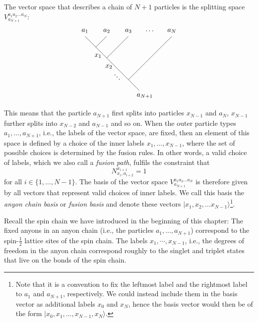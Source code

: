 The vector space that describes a chain of $N+1$ particles is the splitting space $V^{a_1a_2\dots a_N}_{a_{N+1}}$:
	\begin{equation}
		\begin{tikzpicture}[scale=1.1]
			\draw (0,0) -- (-2.5,2.5);
			\draw (-0.5,0.5) -- (1.5,2.5);
			\draw (-1.5,1.5) -- (-0.5,2.5);
			\draw (-2,2) -- (-1.5,2.5);
			\node at (0.25,-0.25) {$a_{N+1}$};
			\node at (-2.5,2.75) {$a_1$};
			\node at (-1.5,2.75) {$a_2$};
			\node at (-0.5,2.75) {$a_3$};
			\node at (1.5,2.75) {$a_N$};
			\node at (0.5,2.75) {$\dots$};
			\node at (-1.9,1.6) {$x_1$};
			\node at (-1.4,1.1) {$x_2$};
			\node at (-1,0.6) {\rotatebox{-45}{$\dots$}};
		\end{tikzpicture}
	\end{equation}
This means that the particle $a_{N+1}$ first splits into particles $x_{N-1}$ and $a_N$, $x_{N-1}$ further splits into $x_{N-2}$ and $a_{N-1}$ and so on. When the outer particle types $a_1,\dots,a_{N+1}$, i.e., the labels of the vector space, are fixed, then an element of this space is defined by a choice of the inner labels $x_1,\dots,x_{N-1}$, where the set of possible choices is determined by the fusion rules. In other words, a valid choice of labels, which we also call a \emph{fusion path}, fulfils the constraint that
	\begin{equation}
		N_{x_i,a_{i+2}}^{x_{i+1}}=1
	\end{equation}
for all $i\in\{1,\dots,N-1\}$. The basis of the vector space $V^{a_1a_2\dots a_N}_{a_{N+1}}$ is therefore given by all vectors that represent valid choices of inner labels. We call this basis the \emph{anyon chain basis} or \emph{fusion basis} and denote these vectors $|x_1,x_2,\dots x_{N-1}\rangle$\footnote{Note that it is a convention to fix the leftmost label and the rightmost label to $a_1$ and $a_{N+1}$, respectively. We could instead include them in the basis vector as additional labels $x_0$ and $x_N$, hence the basis vector would then be of the form $|x_0,x_1,\dots,x_{N-1},x_N\rangle$.}. 

Recall the spin chain we have introduced in the beginning of this chapter: The fixed anyons in an anyon chain (i.e., the particles $a_1,\dots,a_{N+1}$) correspond to the spin-$\frac{1}{2}$ lattice sites of the spin chain. The labels $x_1,\dotsm,x_{N-1}$, i.e., the degrees of freedom in the anyon chain correspond roughly to the singlet and triplet states that live on the bonds of the spin chain.


